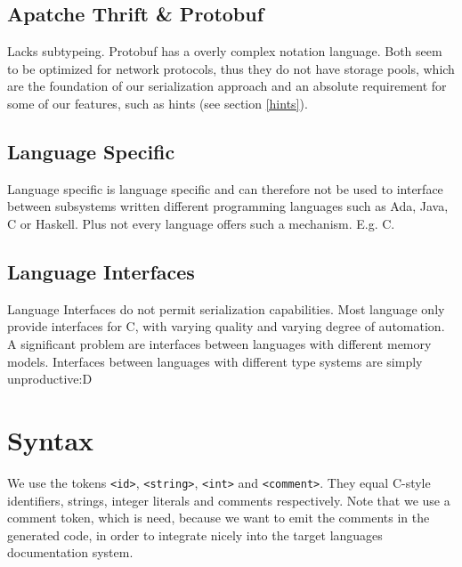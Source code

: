 \documentclass[a4paper,10pt]{article}
\begin{document}
\subsection*{Apatche Thrift \& Protobuf}

Lacks subtypeing. Protobuf has a overly complex notation language. Both seem to be optimized for network protocols, thus they do not have storage pools, which are the foundation of our serialization approach and an absolute requirement for some of our features, such as hints (see section \ref{hints}).


\subsection*{Language Specific}

Language specific is language specific and can therefore not be used to interface between subsystems written different programming languages such as Ada, Java, C or Haskell. Plus not every language offers such a mechanism. E.g. C.


\subsection*{Language Interfaces}
Language Interfaces do not permit serialization capabilities. Most language only provide interfaces for C, with varying quality and varying degree of automation. A significant problem are interfaces between languages with different memory models.
Interfaces between languages with different type systems are simply unproductive:D


\section{Syntax}

We use the tokens \verb/<id>/, \verb/<string>/, \verb/<int>/ and \verb/<comment>/. They equal C-style identifiers, strings, integer literals and comments respectively. Note that we use a comment token, which is need, because we want to emit the comments in the generated code, in order to integrate nicely into the target languages documentation system.
\end{document}
